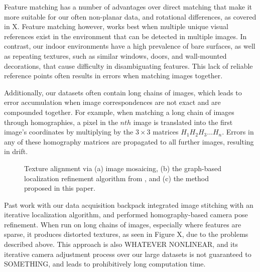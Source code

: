 \documentclass[]{spie}  %
\begin{document}
Feature matching has a number of advantages over direct matching that
make it more suitable for our often non-planar data, and rotational
differences, as covered in X. Feature matching however, works best
when multiple unique visual references exist in the environment that
can be detected in multiple images. In contrast, our indoor
environments have a high prevalence of bare surfaces, as well as
repeating textures, such as similar windows, doors, and wall-mounted
decorations, that cause difficulty in disambiguating features. This
lack of reliable reference points often results in errors when
matching images together.

Additionally, our datasets often contain long chains of images, which
leads to error accumulation when image correspondences are not exact
and are compounded together. For example, when matching a long chain
of images through homographies, a pixel in the $nth$ image is
translated into the first image's coordinates by multiplying by the
$3\times3$ matrices $H_1 H_2 H_3 ... H_n$. Errors in any of these
homography matrices are propagated to all further images, resulting in
drift.

\begin{figure}
  \centering

  \centering

  \centering {}

  \caption{Texture alignment via (a) image mosaicing, (b) the
    graph-based localization refinement algorithm from
    \cite{chen2010indoor}, and (c) the method proposed in this paper.}
  \label{fig:mosaic3D}
\end{figure}


Past work with our data acquisition backpack integrated image
stitching with an iterative localization algorithm, and performed
homography-based camera pose refinement. When run on long chains of
images, especially where features are sparse, it produces distorted
textures, as seen in Figure X, due to the problems described
above. This approach is also WHATEVER NONLINEAR, and its iterative
camera adjustment process over our large datasets is not guaranteed to
SOMETHING, and leads to prohibitively long computation time.
\end{document}

